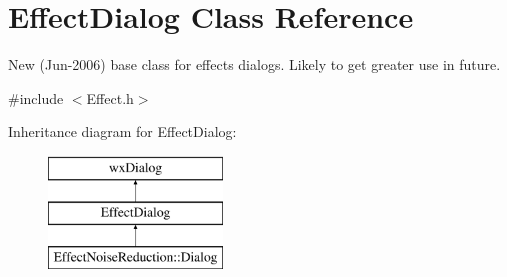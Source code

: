 \hypertarget{class_effect_dialog}{}\section{Effect\+Dialog Class Reference}
\label{class_effect_dialog}


New (Jun-\/2006) base class for effects dialogs. Likely to get greater use in future.  




{\ttfamily \#include $<$Effect.\+h$>$}

Inheritance diagram for Effect\+Dialog\+:\begin{figure}[H]
\begin{center}
\leavevmode
\includegraphics[height=3.000000cm]{class_effect_dialog}
\end{center}
\end{figure}
